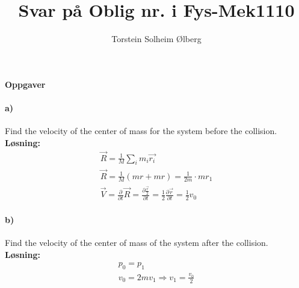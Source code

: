 \documentclass[11pt, A4paper,norsk]{article}
\author{Torstein Solheim Ølberg}
\title{Svar på Oblig nr. i Fys-Mek1110}
\begin{document}
\maketitle
	\begin{center}
\Large \textbf{Oppgaver}
	\end{center}









		\paragraph{a)}
			\begin{flushleft}
Find the velocity of the center of mass for the system before the collision. \\
\vspace{1mm}
\textbf{Løsning:}
\vspace{1mm}
				\begin{align}
\vec{R} = \frac{1}{M} \sum_{i} m_i \vec{r_i} \nonumber \\
\vec{R} = \frac{1}{M}(mr + mr) = \frac{1}{2m} \cdot m r_1 \nonumber \\
\vec{V} = \frac{\partial}{\partial t} \vec{R} = \frac{\partial \frac{\vec{r}}{2}}{\partial t} = \frac{1}{2} \frac{\partial \vec{r}}{\partial t} = \frac{1}{2} v_0 \nonumber
				\end{align}
			\end{flushleft}










		\paragraph{b)}
			\begin{flushleft}
Find the velocity of the center of mass of the system after the collision. \\
\vspace{1mm}
\textbf{Løsning:}
\vspace{1mm}
				\begin{align}
p_0 = p_1 \nonumber \\
v_0 = 2mv_1 \Rightarrow v_1 = \frac{v_0}{2} \nonumber
				\end{align}
			\end{flushleft}
\end{document}
